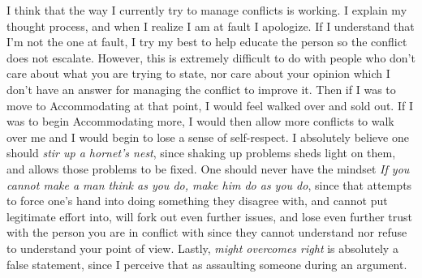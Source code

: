 \documentclass[12pt]{article}
\begin{document}
I think that the way I currently try to manage conflicts is working. I explain my thought process, and when I realize I am at fault I apologize. If I understand that I'm not the one at fault, I try my best to help educate the person so the conflict does not escalate. However, this is extremely difficult to do with people who don't care about what you are trying to state, nor care about your opinion which I don't have an answer for managing the conflict to improve it. Then if I was to move to Accommodating at that point, I would feel walked over and sold out. If I was to begin Accommodating more, I would then allow more conflicts to walk over me and I would begin to lose a sense of self-respect. I absolutely believe one should \emph{stir up a hornet's nest}, since shaking up problems sheds light on them, and allows those problems to be fixed. One should never have the mindset \emph{If you cannot make a man think as you do, make him do as you do}, since that attempts to force one's hand into doing something they disagree with, and cannot put legitimate effort into, will fork out even further issues, and lose even further trust with the person you are in conflict with since they cannot understand nor refuse to understand your point of view. Lastly, \emph{might overcomes right} is absolutely a false statement, since I perceive that as assaulting someone during an argument.
\end{document}
